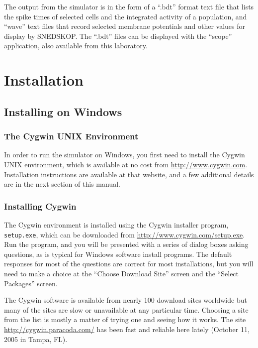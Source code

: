\documentclass[12pt,openany,oneside]{book}
\newcommand{\ticode}[1]{\texttt{#1}}
\begin{document}
The output from the simulator is in the form of a ``.bdt'' format text
file that lists the spike times of selected cells and the integrated
activity of a population, and ``wave'' text files that record selected
membrane potentials and other values for display by SNEDSKOP.  The
``.bdt'' files can be displayed with the ``scope'' application, also
available from this laboratory.

\chapter{Installation}


\section{Installing on Windows}


\subsection{The Cygwin UNIX Environment}

In order to run the simulator on Windows, you first need to install
the Cygwin UNIX environment, which is available at no cost from
\url{http://www.cygwin.com}.  Installation instructions are available
at that website, and a few additional details are in the next section
of this manual.





\subsection{Installing Cygwin}

The Cygwin environment is installed using the Cygwin installer
program, \ticode{setup.exe}, which can be downloaded from
\url{http://www.cygwin.com/setup.exe}.  Run the program, and you will
be presented with a series of dialog boxes asking questions, as is
typical for Windows software install programs.  The default responses
for most of the questions are correct for most installations, but you
will need to make a choice at the ``Choose Download Site'' screen
and the ``Select Packages'' screen.

The Cygwin software is available from nearly 100 download sites
worldwide but many of the sites are slow or unavailable at any
particular time.  Choosing a site from the list is mostly a matter of
trying one and seeing how it works.  The site
\url{http://cygwin.paracoda.com/} has been fast and reliable here
lately (October 11, 2005 in Tampa, FL).
\end{document}

